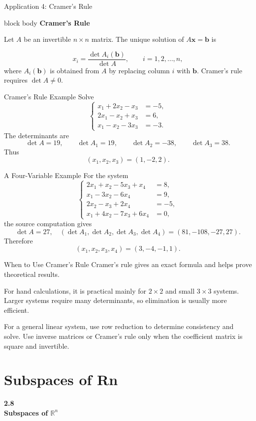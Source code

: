 \documentclass[aspectratio=169]{beamer}
\newcommand{\R}{\mathbb{R}}
\newcommand{\vect}[1]{\mathbf{#1}}
\newcommand{\sectioncard}[2]{%
  \begin{frame}[plain]
    \vfill\centering
    {\Huge\color{lectureorange}\bfseries #1\\[1ex]#2}
    \vfill
  \end{frame}}
\newcommand{\theorembox}[2]{%
  \begin{beamercolorbox}[sep=1.2ex,wd=\linewidth]{block body}
    \textbf{#1}\par #2
  \end{beamercolorbox}}
\begin{document}
\begin{frame}{Application 4: Cramer's Rule}
\theorembox{Cramer's Rule}{Let $A$ be an invertible $n\times n$ matrix. The unique solution of $A\vect x=\vect b$ is}
\[
\boxed{x_i=\frac{\det A_i(\vect b)}{\det A}},
\qquad i=1,2,\ldots,n,
\]
where $A_i(\vect b)$ is obtained from $A$ by replacing column $i$ with $\vect b$.
\pause
Cramer's rule requires $\det A\ne0$.
\end{frame}

\begin{frame}{Cramer's Rule Example}
Solve
\[
\left\{\begin{aligned}
x_1+2x_2-x_3&=-5,\\
2x_1-x_2+x_3&=6,\\
x_1-x_2-3x_3&=-3.
\end{aligned}\right.
\]
The determinants are
\[
\det A=19,
\qquad
\det A_1=19,
\qquad
\det A_2=-38,
\qquad
\det A_3=38.
\]
Thus
\[
\boxed{(x_1,x_2,x_3)=(1,-2,2)}.
\]
\end{frame}

\begin{frame}{A Four-Variable Example}
For the system
\[
\left\{\begin{aligned}
2x_1+x_2-5x_3+x_4&=8,\\
x_1-3x_2-6x_4&=9,\\
2x_2-x_3+2x_4&=-5,\\
x_1+4x_2-7x_3+6x_4&=0,
\end{aligned}\right.
\]
the source computation gives
\[
\det A=27,
\quad
(\det A_1,\det A_2,\det A_3,\det A_4)=(81,-108,-27,27).
\]
Therefore
\[
\boxed{(x_1,x_2,x_3,x_4)=(3,-4,-1,1)}.
\]
\end{frame}

\begin{frame}{When to Use Cramer's Rule}
Cramer's rule gives an exact formula and helps prove theoretical results.
\pause

For hand calculations, it is practical mainly for $2\times2$ and small $3\times3$ systems. Larger systems require many determinants, so elimination is usually more efficient.
\medskip

For a general linear system, use row reduction to determine consistency and solve. Use inverse matrices or Cramer's rule only when the coefficient matrix is square and invertible.
\end{frame}

\section[Subspaces]{Subspaces of Rn}
\sectioncard{2.8}{Subspaces of $\R^n$}
\end{document}
